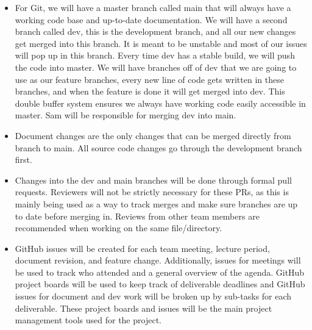 \documentclass{article}
\begin{document}
\begin{itemize}
	\item For Git, we will have a master branch called main that will always have a working code base and up-to-date documentation. We will have a second branch called dev, this is the development branch, and all our new changes get merged into this branch. It is meant to be unstable and most of our issues will pop up in this branch. Every time dev has a stable build, we will push the code into master. We will have branches off of dev that we are going to use as our feature branches, every new line of code gets written in these branches, and when the feature is done it will get merged into dev. This double buffer system ensures we always have working code easily accessible in master. Sam will be responsible for merging dev into main. 
 \item Document changes are the only changes that can be merged directly from branch to main. All source code changes go through the development branch first.
    \item Changes into the dev and main branches will be done through formal pull requests. Reviewers will not be strictly necessary for these PRs, as this is mainly being used as a way to track merges and make sure branches are up to date before merging in. Reviews from other team members are recommended when working on the same file/directory. 
	\item GitHub issues will be created for each team meeting, lecture period, document revision, and feature change. Additionally, issues for meetings will be used to track who attended and a general overview of the agenda. GitHub project boards will be used to keep track of deliverable deadlines and GitHub issues for document and dev work will be broken up by sub-tasks for each deliverable. These project boards and issues will be the main project management tools used for the project.
\end{itemize}
\end{document}
